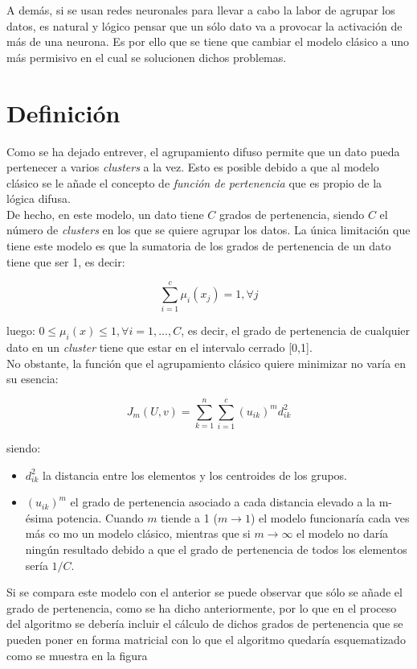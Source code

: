 \documentclass[]{report}
\begin{document}
		A demás, si se usan redes neuronales para llevar a cabo la labor de agrupar los datos, es natural y lógico pensar que un sólo dato va a provocar la activación de más de una neurona. Es por ello que se tiene que cambiar el modelo clásico a uno más permisivo en el cual se solucionen dichos problemas.
			
		\section{Definición}
			Como se ha dejado entrever, el agrupamiento difuso permite que un dato pueda pertenecer a varios \textit{clusters} a la vez. Esto es posible debido a que al modelo clásico se le añade el concepto de \textit{función de pertenencia} que es propio de la lógica difusa.\\
			
			De hecho, en este modelo, un dato tiene $C$ grados de pertenencia, siendo $C$ el número de \textit{clusters} en los que se quiere agrupar los datos. La única limitación que tiene este modelo es que la sumatoria de los grados de pertenencia de un dato tiene que ser 1, es decir:
			
			$$\sum_{i=1}^c\mu_i(x_j) = 1, \forall j$$
			
			luego: $0 \leq \mu_i(x) \leq 1, \forall i=1,...,C$, es decir, el grado de pertenencia de cualquier dato en un \textit{cluster} tiene que estar en el intervalo cerrado [0,1].\\
			
			No obstante, la función que el agrupamiento clásico quiere minimizar no varía en su esencia:
			
			$$J_m(U,v) = \sum_{k=1}^n \sum_{i=1}^c (u_{ik})^m d^2_{ik}$$

			siendo:
			\begin{itemize}
				\item $d^2_{ik}$ la distancia entre los elementos y los centroides de los grupos.
				\item $(u_{ik})^m$ el grado de pertenencia asociado a cada distancia elevado a la m-ésima potencia. Cuando $m$ tiende a 1 ($m \rightarrow 1$) el modelo funcionaría cada ves más co mo un modelo clásico, mientras que si $m \rightarrow \infty$ el modelo no daría ningún resultado debido a que el grado de pertenencia de todos los elementos sería $1/C$.
			\end{itemize}
		
			Si se compara este modelo con el anterior se puede observar que sólo se añade el grado de pertenencia, como se ha dicho anteriormente, por lo que en el proceso del algoritmo se debería incluir el cálculo de dichos grados de pertenencia que se pueden poner en forma matricial con lo que el algoritmo quedaría esquematizado como se muestra en la figura %
			
\end{document}
